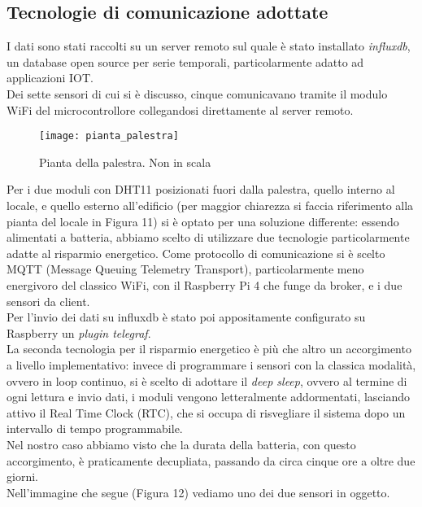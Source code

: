 \documentclass[fleqn,10pt]{SelfArx} %
\begin{document}
\subsection{Tecnologie di comunicazione adottate}

I dati sono stati raccolti su un server remoto sul quale è stato installato \textit{influxdb}, un database 
open source per serie temporali, particolarmente adatto ad applicazioni IOT.\\

Dei sette sensori di cui si è discusso, cinque comunicavano tramite il modulo WiFi del microcontrollore collegandosi 
direttamente al server remoto.\\

\begin{figure}[htb!]\centering
	\texttt{[image: pianta\_palestra]}
	\caption{Pianta della palestra. Non in scala}
	\label{fig:pianta palestra}
\end{figure}

Per i due moduli con DHT11 posizionati fuori dalla palestra, quello interno al locale, e quello esterno all'edificio 
(per maggior chiarezza si faccia riferimento alla pianta del locale in Figura 11) si è optato per una soluzione 
differente: essendo alimentati a batteria, abbiamo scelto di utilizzare due tecnologie particolarmente adatte al 
risparmio energetico. Come protocollo di comunicazione si è scelto MQTT (Message Queuing Telemetry Transport), 
particolarmente meno energivoro del classico WiFi, con il Raspberry Pi 4 che funge da broker, e i due sensori da client. \\
Per l'invio dei dati su influxdb è stato poi appositamente configurato su Raspberry un \textit{plugin telegraf}.\\

La seconda tecnologia per il risparmio energetico è più che altro un accorgimento a livello implementativo: invece di 
programmare i sensori con la classica modalità, ovvero in loop continuo, si è scelto di adottare il \textit{deep sleep}, 
ovvero al termine di ogni lettura e invio dati, i moduli vengono letteralmente addormentati, lasciando attivo il Real 
Time Clock (RTC), che si occupa di risvegliare il sistema dopo un intervallo di tempo programmabile.\\
Nel nostro caso abbiamo visto che la durata della batteria, con questo accorgimento, è praticamente decupliata, 
passando da circa cinque ore a oltre due giorni.\\
Nell'immagine che segue (Figura 12) vediamo uno dei due sensori in oggetto.
\end{document}

